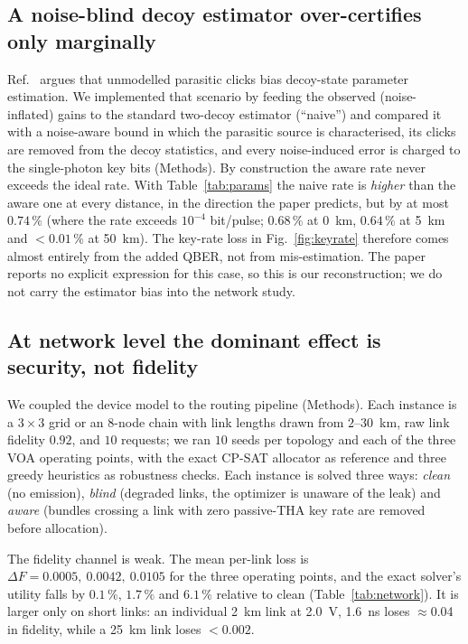 \documentclass[10pt]{article}
\begin{document}
\subsection*{A noise-blind decoy estimator over-certifies only marginally}
Ref.~\cite{li2026voa} argues that unmodelled parasitic clicks bias decoy-state
parameter estimation. We implemented that scenario by feeding the observed
(noise-inflated) gains to the standard two-decoy estimator (``naive'') and
compared it with a noise-aware bound in which the parasitic source is
characterised, its clicks are removed from the decoy statistics, and every
noise-induced error is charged to the single-photon key bits (Methods). By
construction the aware rate never exceeds the ideal rate. With
Table~\ref{tab:params} the naive rate is \emph{higher} than the aware one at
every distance, in the direction the paper predicts, but by at most
$0.74\,\%$ (where the rate exceeds $10^{-4}$ bit/pulse; $0.68\,\%$ at 0~km,
$0.64\,\%$ at 5~km and $<0.01\,\%$ at 50~km). The key-rate loss in
Fig.~\ref{fig:keyrate} therefore comes almost entirely from the added QBER, not
from mis-estimation. The paper reports no explicit expression for this case, so
this is our reconstruction; we do not carry the estimator bias into the network
study.

\subsection*{At network level the dominant effect is security, not fidelity}
We coupled the device model to the routing pipeline
(Methods). Each instance is a $3\times3$ grid or an 8-node chain with link
lengths drawn from $2$--$30$~km, raw link fidelity $0.92$, and $10$ requests; we
ran $10$ seeds per topology and each of the three VOA operating points, with the
exact CP-SAT allocator as reference and three greedy heuristics as robustness
checks. Each instance is solved three ways: \emph{clean} (no emission),
\emph{blind} (degraded links, the optimizer is unaware of the leak) and
\emph{aware} (bundles crossing a link with zero passive-THA key rate are
removed before allocation).

The fidelity channel is weak. The mean per-link loss is
$\Delta F=0.0005,\ 0.0042,\ 0.0105$ for the three operating points, and the
exact solver's utility falls by $0.1\,\%$, $1.7\,\%$ and $6.1\,\%$ relative to
clean (Table~\ref{tab:network}). It is larger only on short links: an
individual 2~km link at 2.0~V, 1.6~ns loses $\approx$0.04 in fidelity, while
a 25~km link loses $<0.002$.
\end{document}
